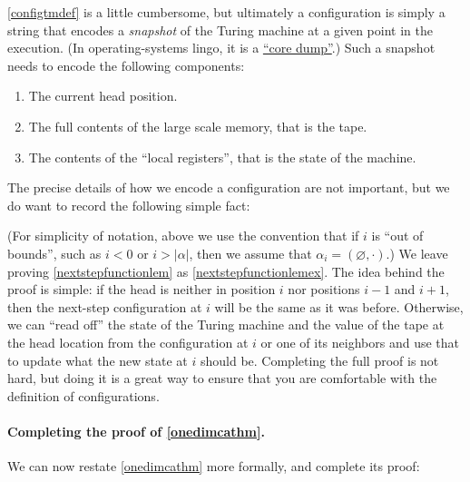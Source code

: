 \cref{configtmdef} is a little cumbersome, but ultimately a
configuration is simply a string that encodes a \emph{snapshot} of the
Turing machine at a given point in the execution. (In operating-systems
lingo, it is a \href{https://goo.gl/AsccXh}{``core dump''}.) Such a
snapshot needs to encode the following components:

\begin{enumerate}
\def\labelenumi{\arabic{enumi}.}
\item
  The current head position.
\item
  The full contents of the large scale memory, that is the tape.
\item
  The contents of the ``local registers'', that is the state of the
  machine.
\end{enumerate}

The precise details of how we encode a configuration are not important,
but we do want to record the following simple fact:

\hypertarget{nextstepfunctionlem}{}

(For simplicity of notation, above we use the convention that if \(i\)
is ``out of bounds'', such as \(i<0\) or \(i>|\alpha|\), then we assume
that \(\alpha_i = (\varnothing,\cdot)\).) We leave proving
\cref{nextstepfunctionlem} as \cref{nextstepfunctionlemex}. The idea
behind the proof is simple: if the head is neither in position \(i\) nor
positions \(i-1\) and \(i+1\), then the next-step configuration at \(i\)
will be the same as it was before. Otherwise, we can ``read off'' the
state of the Turing machine and the value of the tape at the head
location from the configuration at \(i\) or one of its neighbors and use
that to update what the new state at \(i\) should be. Completing the
full proof is not hard, but doing it is a great way to ensure that you
are comfortable with the definition of configurations.

\paragraph{Completing the proof of \cref{onedimcathm}.} We can now
restate \cref{onedimcathm} more formally, and complete its proof:

